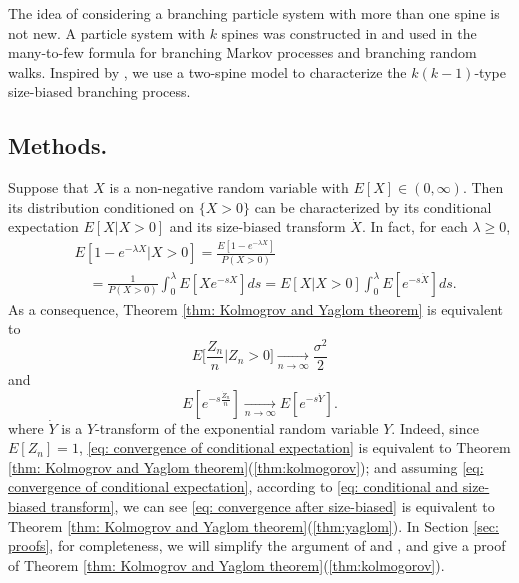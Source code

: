 \documentclass[ECP]{ejpecp} %
\begin{document}
The idea of considering a branching particle system with more than one spine is not new.
A particle system with $k$ spines  was constructed in \cite{harris2015many} and used in the  many-to-few formula for branching Markov processes and branching random walks.
Inspired by \cite{harris2015many}, we use a two-spine model to characterize the $k(k-1)$-type size-biased branching process.


\subsection{Methods.}
\label{sec: Methods}
Suppose that $X$ is a non-negative random variable
with $E[X] \in (0,\infty)$. Then
its distribution conditioned on $\{ X > 0\}$ can be characterized by its conditional expectation $E[X|X>0]$ and its size-biased transform $\dot X$.
In fact, for each $\lambda \geq 0$,
\begin{equation}
\label{eq: conditional and size-biased transform}
\begin{split}
&E[1-e^{-\lambda X}|X>0]
= \frac{E[1-e^{-\lambda X}]}{P(X>0)}
\\&\quad = \frac{1}{P(X>0)}\int_0^\lambda E[Xe^{-s X}]ds = E[X|X>0]\int_0^\lambda E[e^{-s \dot X}]ds.
\end{split}
\end{equation}
As a consequence,
Theorem \ref{thm: Kolmogrov and Yaglom theorem}	is equivalent to
\begin{equation}
\label{eq: convergence of conditional expectation}
E\big[\frac{Z_n}{n}| Z_n > 0\big]
\xrightarrow[n\to \infty]{} \frac{\sigma^2}{2}
\end{equation}
and
\[
\label{eq: convergence after size-biased}
E[e^{-s \frac{\dot Z_n}{n}}]
\xrightarrow[n\to \infty]{} E[e^{-s \dot Y}].
\]
where $\dot Y$ is a $Y$-transform
of the exponential random variable $Y$.
Indeed, since $E[Z_n] = 1$, \eqref{eq: convergence of conditional expectation} is equivalent to Theorem \ref{thm: Kolmogrov and Yaglom theorem}(\ref{thm:kolmogorov});
and assuming \eqref{eq: convergence of conditional expectation},
according to \eqref{eq: conditional and size-biased transform}, we can see \eqref{eq: convergence after size-biased} is equivalent to Theorem \ref{thm: Kolmogrov and Yaglom theorem}(\ref{thm:yaglom}).
In Section \ref{sec: proofs}, for completeness, we will simplify
the argument of \cite{geiger1999elementary} and \cite{VD},
and give a proof of Theorem \ref{thm: Kolmogrov and Yaglom theorem}(\ref{thm:kolmogorov}).
\end{document}

